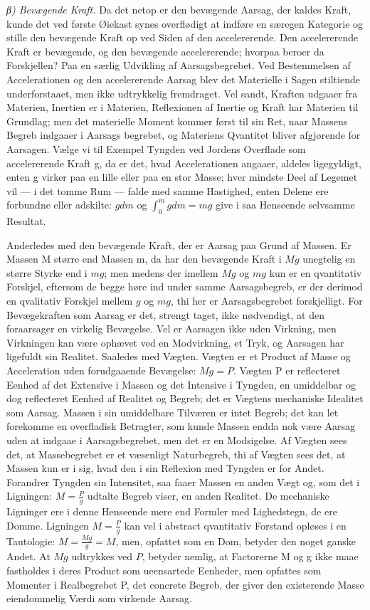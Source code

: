 \documentclass[12pt,a4paper]{book}
\newcommand{\subrunin}[1]{\emph{#1}\hspace{0.4em}}
\begin{document}
\subrunin{β) Bevægende Kraft.} Da det netop er den bevægende Aarsag, der
kaldes Kraft, kunde det ved første Øiekast synes overflødigt at indføre
en særegen Kategorie og stille den bevægende Kraft op ved Siden af den
accelererende. Den accelererende Kraft er bevægende, og den bevægende
accelererende; hvorpaa beroer da Forskjellen? Paa en særlig Udvikling af
Aarsagsbegrebet. Ved Bestemmelsen af Accelerationen og den accelererende
Aarsag blev det Materielle i Sagen stiltiende underforstaaet, men ikke
udtrykkelig fremdraget. Vel sandt, Kraften udgaaer fra Materien, Inertien
er i Materien, Reflexionen af Inertie og Kraft har Materien til Grundlag;
men det materielle Moment kommer først til sin Ret, naar Massens Begreb
indgaaer i Aarsags\-%
begrebet, og Materiens Qvantitet bliver afgjørende for Aarsagen. Vælge vi
til Exempel Tyngden ved Jordens Overflade som accelererende Kraft g, da
er det, hvad Accelerationen angaaer, aldeles ligegyldigt, enten g virker
paa en lille eller paa en stor Masse; hver mindste Deel af Legemet vil
--- i det tomme Rum --- falde med samme Hastighed, enten Delene ere
forbundne eller adskilte: $gdm$ og $\int_{0}^{m} gdm = mg$ give i saa
Henseende selvsamme Resultat.

Anderledes med den bevægende Kraft, der er Aarsag paa Grund af Massen. Er
Massen M større end Massen m, da har den bevægende Kraft i $Mg$ unegtelig
en større Styrke end i $mg$; men medens der imellem $Mg$ og $mg$ kun er
en qvantitativ Forskjel, eftersom de begge høre ind under samme
Aarsagsbegreb, er der derimod en qvalitativ Forskjel mellem $g$ og $mg$,
thi her er Aarsagsbegrebet forskjelligt. For Bevægekraften som Aarsag er
det, strengt taget, ikke nødvendigt, at den foraarsager en virkelig
Bevægelse. Vel er Aarsagen ikke uden Virkning, men Virkningen kan være
ophævet ved en Modvirkning, et Tryk, og Aarsagen har ligefuldt sin
Realitet. Saaledes med Vægten. Vægten er et Product af Masse og
Acceleration uden forudgaaende Bevægelse: $Mg = P$. Vægten P er
reflecteret Eenhed af det Extensive i Massen og det Intensive i Tyngden,
en umiddelbar og dog reflecteret Eenhed af Realitet og Begreb; det er
Vægtens mechaniske Idealitet som Aarsag. Massen i sin umiddelbare
Tilværen er intet Begreb; det kan let forekomme en overfladisk Betragter,
som kunde Massen endda nok være Aarsag uden at indgaae i
Aarsagsbegrebet, men det er en Modsigelse. Af Vægten sees det, at
Massebegrebet er et væsenligt Naturbegreb, thi af Vægten sees det, at
Massen kun er i sig, hvad den i sin Reflexion med Tyngden er for Andet.
Forandrer Tyngden sin Intensitet, saa faaer Massen en anden Vægt og, som
det i Ligningen: $M = \frac{P}{g}$ udtalte Begreb
viser, en anden Realitet. De mechaniske Ligninger ere i denne Henseende
mere end Formler med Lighedstegn, de ere Domme. Ligningen
$M = \frac{P}{g}$ kan vel i abstract qvantitativ Forstand opløses i en
Tautologie: $M = \frac{Mg}{g} = M$, men, opfattet som en Dom, betyder den
noget ganske Andet. At $Mg$ udtrykkes ved $P$, betyder nemlig, at
Factorerne M og g ikke maae fastholdes i deres Product som ueensartede
Eenheder, men opfattes som Momenter i Realbegrebet P, det concrete
Begreb, der giver den existerende Masse eiendommelig Værdi som virkende
Aarsag.
\end{document}
